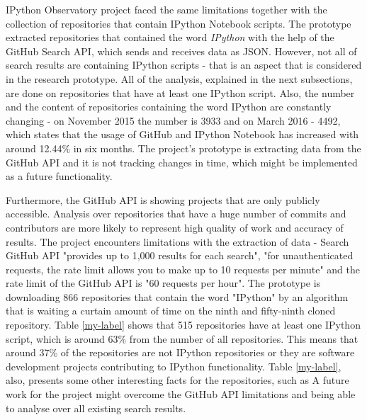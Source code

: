 IPython Observatory project faced the same limitations together with the collection of repositories that contain IPython Notebook scripts. The prototype extracted repositories that contained the word \textit{IPython} with the help of the GitHub Search API\cite{GitAPISearch}, which sends and receives data as JSON\cite{json}. However, not all of search results are containing IPython scripts - that is an aspect that is considered in the research prototype. All of the analysis, explained in the next subsections, are done on repositories that have at least one IPython script. Also, the number and the content of repositories containing the word IPython are constantly changing - on November 2015 the number is 3933 and on March 2016 - 4492, which states that the usage of GitHub and IPython Notebook has increased with around 12.44\% in six months. The project's prototype is extracting data from the GitHub API and it is not tracking changes in time, which might be implemented as a future functionality.

Furthermore, the GitHub API is showing projects that are only publicly accessible. Analysis over repositories that have a huge number of commits and contributors are more likely to represent high quality of work and accuracy of results. The project encounters limitations with the extraction of data - Search GitHub API "provides up to 1,000 results for each search"\cite{GitAPISearch}, "for unauthenticated requests, the rate limit allows you to make up to 10 requests per minute"\cite{GitAPISearch} and the rate limit of the GitHub API is "60 requests per hour"\cite{GitAPI}. The prototype is downloading 866 repositories that contain the word "IPython" by an algorithm that is waiting a curtain amount of time on the ninth and fifty-ninth cloned repository. Table \ref{my-label} shows that 515 repositories have at least one IPython script, which is around 63\% from the number of all repositories. This means that around 37\% of the repositories are not IPython repositories or they are software development projects contributing to IPython functionality. Table \ref{my-label}, also, presents some other interesting facts for the repositories, such as  A future work for the project might overcome the GitHub API limitations and being able to analyse over all existing search results. 

